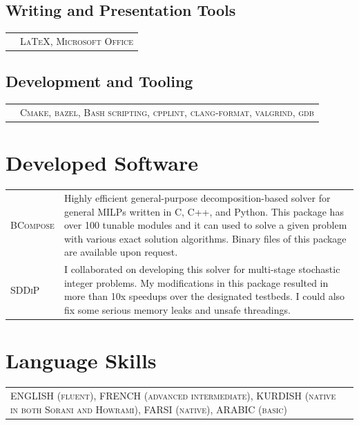 \documentclass[10PT,letter]{article}
\newcommand{\subsectionstyle}[1]{\normalfont\selectfont\textcolor{titlecol}{\sffamily #1}}
\newcommand{\numbox}[1]{} %
\begin{document}
		\subsection*{\subsectionstyle{Writing and Presentation Tools}}
				\begin{tabular}{p{.2in}p{5.55in}}
					 & \textsc{\LaTeX, Microsoft Office}
				\end{tabular}

        \subsection*{\subsectionstyle{Development and Tooling}}
        		\begin{tabular}{p{.2in}p{5.55in}}
        			& 	\textsc{Cmake, bazel, Bash scripting,  cpplint, clang-format, valgrind, gdb} 
        		\end{tabular}


\section*{\numbox{9}\bfseries\textcolor{titlecol}{\sffamily Developed Software}}
			\begin{tabular}{p{1.2in}p{5.55in}}
				\textsc{BCompose} &  
												Highly efficient general-purpose decomposition-based solver for general MILPs written in C, C++, and Python. This package has over 100 tunable modules and it can used to solve a given problem with various exact solution algorithms. 
												Binary files of this package are available upon request.\\[.5mm]
				\textsc{SDDiP} & 
												I collaborated on developing  this solver for multi-stage stochastic integer problems. My modifications in this package resulted in more than 10x speedups  over the designated testbeds.  I could also fix some serious memory leaks and unsafe threadings. \\[.5mm]
			\end{tabular}

\section*{\numbox{9}\bfseries\textcolor{titlecol}{\sffamily Language Skills}}

	\begin{tabular}{p{7.2in}p{5.55in}}
		\textsc{ENGLISH (fluent),   FRENCH (advanced intermediate),  KURDISH (native in both Sorani and Howrami), FARSI (native), ARABIC (basic)} & \\[.5mm]
	\end{tabular}
\end{document}
